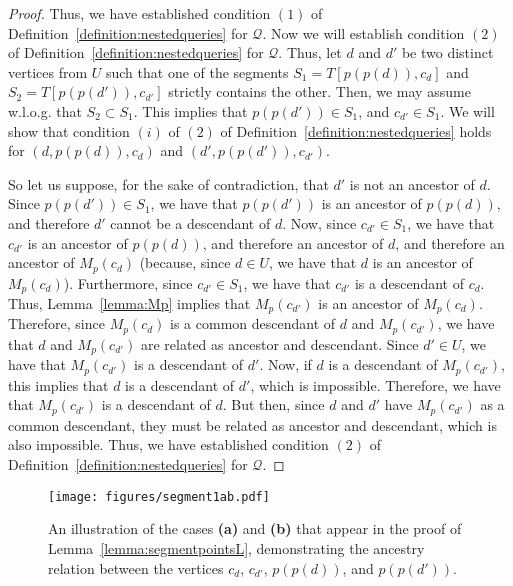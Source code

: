 \documentclass[11pt,a4paper]{article}
\begin{document}
\begin{proof}
Thus, we have established condition $(1)$ of Definition~\ref{definition:nestedqueries} for $\mathcal{Q}$. Now we will establish condition $(2)$ of Definition~\ref{definition:nestedqueries} for $\mathcal{Q}$. Thus, let $d$ and $d'$ be two distinct vertices from $U$ such that one of the segments $S_1=T[p(p(d)),c_d]$ and $S_2=T[p(p(d')),c_{d'}]$ strictly contains the other. Then, we may assume w.l.o.g. that $S_2\subset S_1$. This implies that $p(p(d'))\in S_1$, and $c_{d'}\in S_1$. We will show that condition $(i)$ of $(2)$ of Definition~\ref{definition:nestedqueries} holds for $(d,p(p(d)),c_d)$ and $(d',p(p(d')),c_{d'})$. 

So let us suppose, for the sake of contradiction, that $d'$ is not an ancestor of $d$. Since $p(p(d'))\in S_1$, we have that $p(p(d'))$ is an ancestor of $p(p(d))$, and therefore $d'$ cannot be a descendant of $d$. Now, since $c_{d'}\in S_1$, we have that $c_{d'}$ is an ancestor of $p(p(d))$, and therefore an ancestor of $d$, and therefore an ancestor of $M_p(c_d)$ (because, since $d\in U$, we have that $d$ is an ancestor of $M_p(c_d)$). Furthermore, since $c_{d'}\in S_1$, we have that $c_{d'}$ is a descendant of $c_d$. Thus, Lemma~\ref{lemma:Mp} implies that $M_p(c_{d'})$ is an ancestor of $M_p(c_d)$. Therefore, since $M_p(c_d)$ is a common descendant of $d$ and $M_p(c_{d'})$, we have that $d$ and $M_p(c_{d'})$ are related as ancestor and descendant. Since $d'\in U$, we have that $M_p(c_{d'})$ is a descendant of $d'$. Now, if $d$ is a descendant of $M_p(c_{d'})$, this implies that $d$ is a descendant of $d'$, which is impossible. Therefore, we have that $M_p(c_{d'})$ is a descendant of $d$. But then, since $d$ and $d'$ have $M_p(c_{d'})$ as a common descendant, they must be related as ancestor and descendant, which is also impossible. Thus, we have established condition $(2)$ of Definition~\ref{definition:nestedqueries} for $\mathcal{Q}$. 

\end{proof}


\begin{figure}[h!]\centering
\texttt{[image: figures/segment1ab.pdf]}
\caption{\small{An illustration of the cases \textbf{(a)} and \textbf{(b)} that appear in the proof of Lemma~\ref{lemma:segmentpointsL}, demonstrating the ancestry relation between the vertices $c_d$, $c_{d'}$, $p(p(d))$, and $p(p(d'))$.}}\label{figure:segment1ab}
\end{figure}
\end{document}
